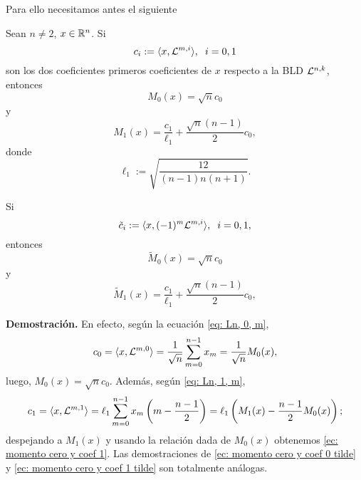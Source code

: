Para ello necesitamos antes el siguiente
\begin{lema}
Sean $n \neq 2$, $x \in \mathbb{R}^{n}$.
Si
\[
c_{i} := \langle x, \mathcal{L}^{m,i} \rangle,
\hspace{0.2cm} i = 0,1
\]
son los dos coeficientes primeros coeficientes
de $x$ respecto a la BLD $\mathcal{L}^{n,k}$,
entonces 
\begin{equation}
\label{ec: momento cero y coef 0}
M_{0}(x) = \sqrt{n} c_{0}
\end{equation}
y
 \begin{equation}
\label{ec: momento cero y coef 1}
M_{1}(x) = \frac{c_{1}}{\ell_{1}} + 
\frac{\sqrt{n}(n-1)}{2}c_{0},
\end{equation}
donde
\begin{equation}
\label{ec: l1}
\ell_{1}:= \sqrt{\frac{
12
}{(n-1)n(n+1)}}.
\end{equation}


Si 
\[
\tilde{c}_{i} := \langle x, (-1)^{m}\mathcal{L}^{m,i} \rangle,
\hspace{0.2cm} i = 0,1,
\]
entonces
\begin{equation}
\label{ec: momento cero y coef 0 tilde}
\tilde{M}_{0}(x) = \sqrt{n} c_{0}
\end{equation}
y
 \begin{equation}
\label{ec: momento cero y coef 1 tilde}
\tilde{M}_{1}(x) = \frac{c_{1}}{\ell_{1}} + 
\frac{\sqrt{n}(n-1)}{2}c_{0},
\end{equation}
\end{lema}
\noindent
\textbf{Demostración.}
En efecto, según la ecuación
\eqref{eq: Ln, 0, m}, 
\[
c_{0}= 
\langle x, \mathcal{L}^{m,0} \rangle
= \frac{1}{\sqrt{n}} \sum\limits_{m=0}^{n-1}x_{m}
= \frac{1}{\sqrt{n}} M_{0}(x),
\]
luego, 
$M_{0}(x) = \sqrt{n} c_{0}$.
Además, según \eqref{eq: Ln, 1, m},
\[
c_{1}= 
\langle x, \mathcal{L}^{m,1} \rangle
= \ell_{1} \sum\limits_{m=0}^{n-1}x_{m} \left(
m-  \frac{n-1}{2}
\right)
= \ell_{1} \left(
M_{1}(x)-\frac{n-1}{2}M_{0}(x)
\right);
\]
despejando a $M_{1}(x)$ y usando la relación dada
de $M_{0}(x)$ obtenemos 
\eqref{ec: momento cero y coef 1}.
Las demostraciones de 
\eqref{ec: momento cero y coef 0 tilde} y 
\eqref{ec: momento cero y coef 1 tilde} son
totalmente análogas.
\QEDB
\vspace{0.2cm}

